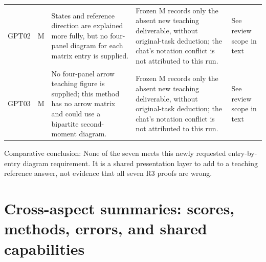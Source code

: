 \documentclass[11pt,a4paper]{article}
\begin{document}
{\begin{longtable}
{}GPT02 & M & States and reference direction are explained more fully,\allowbreak{} but no four-panel diagram for each matrix entry is supplied. & Frozen M records only the absent new teaching deliverable,\allowbreak{} without original-task deduction; the chat’s notation conflict is not attributed to this run. & See review scope in text\tabularnewline
{}GPT03 & M & No four-panel arrow teaching figure is supplied; this method has no arrow matrix and could use a bipartite second-moment diagram. & Frozen M records only the absent new teaching deliverable,\allowbreak{} without original-task deduction; the chat’s notation conflict is not attributed to this run. & See review scope in text\tabularnewline
\bottomrule
\end{longtable}
}
Comparative conclusion: None of the seven meets this newly requested entry-by-entry diagram requirement. It is a shared presentation layer to add to a teaching reference answer,\allowbreak{} not evidence that all seven R3 proofs are wrong.

\clearpage
\section{Cross-aspect summaries: scores,\allowbreak{} methods,\allowbreak{} errors,\allowbreak{} and shared capabilities}
\end{document}
